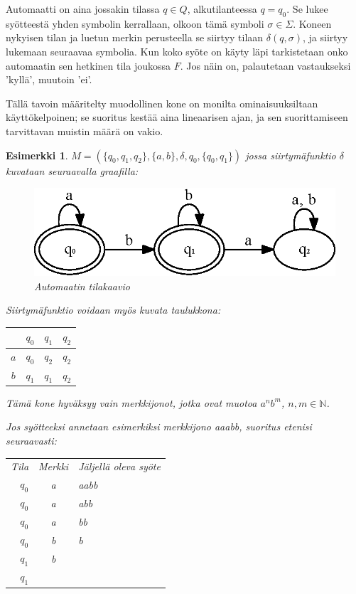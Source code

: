 \documentclass[a4paper, 12pt]{article}
\newtheorem{example}{Esimerkki}
\begin{document}
Automaatti on aina jossakin tilassa $q \in Q$, alkutilanteessa $q = q_0$. Se lukee syötteestä yhden symbolin kerrallaan, olkoon tämä symboli $\sigma \in \Sigma$. Koneen nykyisen tilan ja luetun merkin perusteella se siirtyy tilaan $\delta (q, \sigma)$, ja siirtyy lukemaan seuraavaa symbolia. Kun koko syöte on käyty läpi tarkistetaan onko automaatin sen hetkinen tila joukossa $F$. Jos näin on, palautetaan vastaukseksi 'kyllä', muutoin 'ei'.

Tällä tavoin määritelty muodollinen kone on monilta ominaisuuksiltaan käyttökelpoinen; se suoritus kestää aina lineaarisen ajan, ja sen suorittamiseen tarvittavan muistin määrä on vakio.

\begin{example}
$M = (\{q_0, q_1, q_2\}, \{a, b\}, \delta, q_0, \{q_0, q_1\})$ jossa siirtymäfunktio $\delta$ kuvataan seuraavalla graafilla:

\begin{figure}[H]
\centering
\includegraphics{graph2.eps}
\caption{Automaatin tilakaavio}
\end{figure}

Siirtymäfunktio voidaan myös kuvata taulukkona:
\\
\begin{center}
\begin{tabular} {c | c c c}
& $q_0$ & $q_1$ & $q_2$ \\
\hline
$a$ & $q_0$ & $q_2$ & $q_2$ \\
$b$ & $q_1$ & $q_1$ & $q_2$ \\
\end{tabular}
\end{center}

Tämä kone hyväksyy vain merkkijonot, jotka ovat muotoa $a^nb^m$, $n, m \in \mathbb{N}$.

Jos syötteeksi annetaan esimerkiksi merkkijono aaabb, suoritus etenisi seuraavasti:\\

\begin{center}
\begin{tabular}{r c l }
Tila & Merkki & Jäljellä oleva syöte \\
$q_0$ & a & aabb \\
$q_0$ & a & abb \\
$q_0$ & a & bb \\
$q_0$ & b & b \\
$q_1$ & b & \\
$q_1$ & & \\
\end{tabular}
\end{center}


\end{example}
\end{document}
